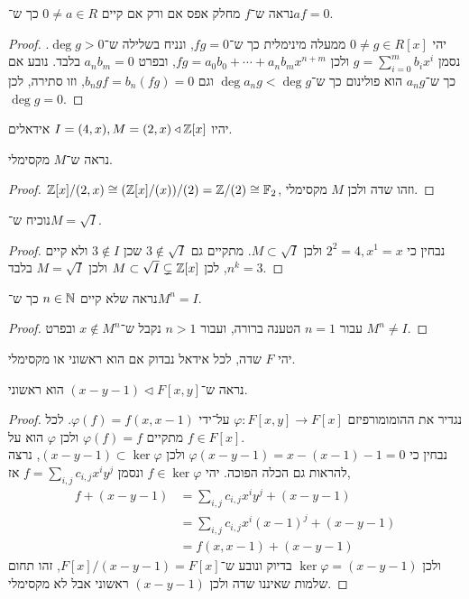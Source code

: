 \subquestion{}
נראה ש־$f$ מחלק אפס אם ורק אם קיים $0 \ne a \in R$ כך ש־$a f = 0$.
\begin{proof}
	יהי $0 \ne g \in R[x]$ ממעלה מינימלית כך ש־$f g = 0$, ונניח בשלילה ש־$\deg g > 0$.
	נסמן $g = \sum_{i = 0}^m b_i x^i$ ולכן $f g = a_0 b_0 + \cdots + a_n b_m x^{n + m}$, ובפרט $a_n b_m = 0$ בלבד.
	נובע אם כך ש־$a_n g$ הוא פולינום כך ש־$\deg a_n g < \deg g$ וגם $b_n g f = b_n (f g) = 0$, וזו סתירה, לכן $\deg g = 0$.
\end{proof}

\question{}
יהיו $I = (4, x), M = (2, x) \triangleleft \mathbb{Z}[x]$ אידאלים.

\subquestion{}
נראה ש־$M$ מקסימלי.
\begin{proof}
	$\mathbb{Z}[x] / (2, x) \cong (\mathbb{Z}[x] / (x)) / (2) = \mathbb{Z} / (2) \cong \mathbb{F}_2$, וזהו שדה ולכן $M$ מקסימלי.
\end{proof}

\subquestion{}
נוכיח ש־$M = \sqrt{I}$.
\begin{proof}
	נבחין כי $2^2 = 4, x^1 = x$ ולכן $M \subset \sqrt{I}$.
	מתקיים גם $3 \notin \sqrt{I}$ שכן $3 \notin I$ ולא קיים $n^k = 3$, לכן $M \subset \sqrt{I} \subsetneq \mathbb{Z}[x]$ ולכן $M = \sqrt{I}$ בלבד.
\end{proof}

\subquestion{}
נראה שלא קיים $n \in \mathbb{N}$ כך ש־$M^n = I$.
\begin{proof}
	עבור $n = 1$ הטענה ברורה, ועבור $n > 1$ נקבל ש־$x \notin M^n$ ובפרט $M^n \ne I$.
\end{proof}

\question{}
יהי $F$ שדה, לכל אידאל נבדוק אם הוא ראשוני או מקסימלי.

\subquestion{}
נראה ש־$(x - y - 1) \triangleleft F[x, y]$ הוא ראשוני.
\begin{proof}
	נגדיר את ההומומורפיזם $\varphi : F[x, y] \to F[x]$ על־ידי $\varphi(f) = f(x, x - 1)$.
	לכל $f \in F[x]$ מתקיים $\varphi(f) = f$ ולכן $\varphi$ הוא על. \\
	נבחין כי $\varphi(x - y - 1) = x - (x - 1) - 1 = 0$ ולכן $(x - y - 1) \subset \ker \varphi$, נרצה להראות גם הכלה הפוכה.
	יהי $f \in \ker \varphi$ ונסמן $f = \sum_{i, j} c_{i, j} x^i y^j$ אז,
	\begin{align*}
		f + (x - y - 1)
		& = \sum_{i, j} c_{i, j} x^i y^j + (x - y - 1) \\
		& = \sum_{i, j} c_{i, j} x^i {(x - 1)}^j + (x - y - 1) \\
		& = f(x, x - 1) + (x - y - 1)
	\end{align*}
	ולכן $\ker \varphi = (x - y - 1)$ בדיוק ונובע ש־$F[x] / (x - y - 1) = F[x]$, זהו תחום שלמות שאיננו שדה ולכן $(x - y - 1)$ ראשוני אבל לא מקסימלי.
\end{proof}

